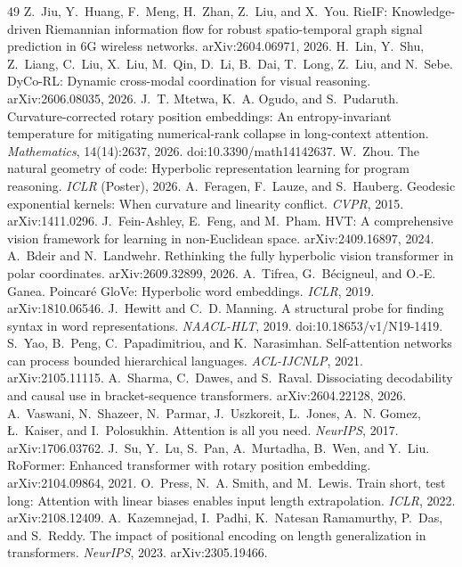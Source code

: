 \documentclass[11pt]{article}
\begin{document}
\begin{thebibliography}{49}
 Z.~Jiu, Y.~Huang, F.~Meng, H.~Zhan, Z.~Liu, and X.~You. RieIF: Knowledge-driven Riemannian information flow for robust spatio-temporal graph signal prediction in 6G wireless networks. arXiv:2604.06971, 2026.
 H.~Lin, Y.~Shu, Z.~Liang, C.~Liu, X.~Liu, M.~Qin, D.~Li, B.~Dai, T.~Long, Z.~Liu, and N.~Sebe. DyCo-RL: Dynamic cross-modal coordination for visual reasoning. arXiv:2606.08035, 2026.
 J.~T. Mtetwa, K.~A. Ogudo, and S.~Pudaruth. Curvature-corrected rotary position embeddings: An entropy-invariant temperature for mitigating numerical-rank collapse in long-context attention. \emph{Mathematics}, 14(14):2637, 2026. doi:10.3390/math14142637.
 W.~Zhou. The natural geometry of code: Hyperbolic representation learning for program reasoning. \emph{ICLR} (Poster), 2026.
 A.~Feragen, F.~Lauze, and S.~Hauberg. Geodesic exponential kernels: When curvature and linearity conflict. \emph{CVPR}, 2015. arXiv:1411.0296.
 J.~Fein-Ashley, E.~Feng, and M.~Pham. HVT: A comprehensive vision framework for learning in non-Euclidean space. arXiv:2409.16897, 2024.
 A.~Bdeir and N.~Landwehr. Rethinking the fully hyperbolic vision transformer in polar coordinates. arXiv:2609.32899, 2026.
 A.~Tifrea, G.~B\'ecigneul, and O.-E. Ganea. Poincar\'e GloVe: Hyperbolic word embeddings. \emph{ICLR}, 2019. arXiv:1810.06546.
 J.~Hewitt and C.~D. Manning. A structural probe for finding syntax in word representations. \emph{NAACL-HLT}, 2019. doi:10.18653/v1/N19-1419.
 S.~Yao, B.~Peng, C.~Papadimitriou, and K.~Narasimhan. Self-attention networks can process bounded hierarchical languages. \emph{ACL-IJCNLP}, 2021. arXiv:2105.11115.
 A.~Sharma, C.~Dawes, and S.~Raval. Dissociating decodability and causal use in bracket-sequence transformers. arXiv:2604.22128, 2026.
 A.~Vaswani, N.~Shazeer, N.~Parmar, J.~Uszkoreit, L.~Jones, A.~N. Gomez, {\L}.~Kaiser, and I.~Polosukhin. Attention is all you need. \emph{NeurIPS}, 2017. arXiv:1706.03762.
 J.~Su, Y.~Lu, S.~Pan, A.~Murtadha, B.~Wen, and Y.~Liu. RoFormer: Enhanced transformer with rotary position embedding. arXiv:2104.09864, 2021.
 O.~Press, N.~A. Smith, and M.~Lewis. Train short, test long: Attention with linear biases enables input length extrapolation. \emph{ICLR}, 2022. arXiv:2108.12409.
 A.~Kazemnejad, I.~Padhi, K.~Natesan Ramamurthy, P.~Das, and S.~Reddy. The impact of positional encoding on length generalization in transformers. \emph{NeurIPS}, 2023. arXiv:2305.19466.

\end{thebibliography}
\end{document}
